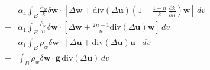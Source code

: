 \documentclass[preprint,12pt,a4paper]{elsarticle}
\begin{document}
\begin{itemize}
\begin{eqnarray}
\nonumber \\
&-& \alpha_4 \int_B \frac{\mu_w}{k} \delta \boldsymbol{w} \cdot \left[\Delta\boldsymbol{w} + \mbox{div}(\Delta\boldsymbol{u})\left(1-\frac{1-n}{k} \, \frac{\partial k}{\partial n}\right) \boldsymbol{w}\right] \, dv 
\nonumber\\
&-& \alpha_1\int_B\frac{\rho_w}{n} \delta\boldsymbol{w} \cdot \left[\Delta \boldsymbol{w} + \frac{2n-1}{n}\mbox{div}(\Delta\boldsymbol{u})\boldsymbol{w}\right] \, dv
\nonumber\\
&-& \alpha_1 \int_B \rho_w  \delta\boldsymbol{w} \cdot \left[\Delta \boldsymbol{u} +  \mbox{div}(\Delta\boldsymbol{u}) \boldsymbol{u} \right]\, dv
\nonumber\\
&+& \int_B \rho_w \delta\boldsymbol{w} \cdot \boldsymbol{g} \, \mbox{div}(\Delta\boldsymbol{u})\, dv
\end{eqnarray}\\
\end{itemize}




\end{document}
